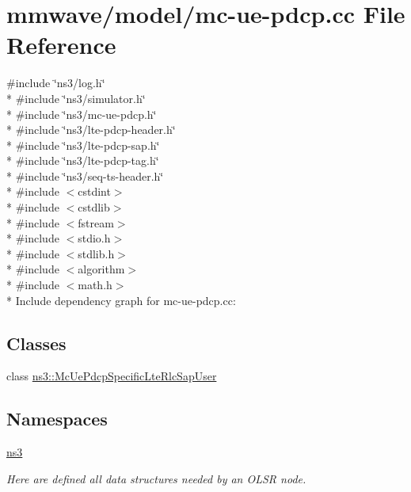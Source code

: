 \hypertarget{mmwave_2model_2mc-ue-pdcp_8cc}{}\section{mmwave/model/mc-\/ue-\/pdcp.cc File Reference}
\label{mmwave_2model_2mc-ue-pdcp_8cc}
{\ttfamily \#include \char`\"{}ns3/log.\+h\char`\"{}}\\*
{\ttfamily \#include \char`\"{}ns3/simulator.\+h\char`\"{}}\\*
{\ttfamily \#include \char`\"{}ns3/mc-\/ue-\/pdcp.\+h\char`\"{}}\\*
{\ttfamily \#include \char`\"{}ns3/lte-\/pdcp-\/header.\+h\char`\"{}}\\*
{\ttfamily \#include \char`\"{}ns3/lte-\/pdcp-\/sap.\+h\char`\"{}}\\*
{\ttfamily \#include \char`\"{}ns3/lte-\/pdcp-\/tag.\+h\char`\"{}}\\*
{\ttfamily \#include \char`\"{}ns3/seq-\/ts-\/header.\+h\char`\"{}}\\*
{\ttfamily \#include $<$cstdint$>$}\\*
{\ttfamily \#include $<$cstdlib$>$}\\*
{\ttfamily \#include $<$fstream$>$}\\*
{\ttfamily \#include $<$stdio.\+h$>$}\\*
{\ttfamily \#include $<$stdlib.\+h$>$}\\*
{\ttfamily \#include $<$algorithm$>$}\\*
{\ttfamily \#include $<$math.\+h$>$}\\*
Include dependency graph for mc-\/ue-\/pdcp.cc\+:
\subsection*{Classes}
\begin{DoxyCompactItemize}
\item 
class \hyperlink{classns3_1_1McUePdcpSpecificLteRlcSapUser}{ns3\+::\+Mc\+Ue\+Pdcp\+Specific\+Lte\+Rlc\+Sap\+User}
\end{DoxyCompactItemize}
\subsection*{Namespaces}
\begin{DoxyCompactItemize}
\item 
 \hyperlink{namespacens3}{ns3}
\begin{DoxyCompactList}\small\item\em Here are defined all data structures needed by an O\+L\+SR node. \end{DoxyCompactList}\end{DoxyCompactItemize}
